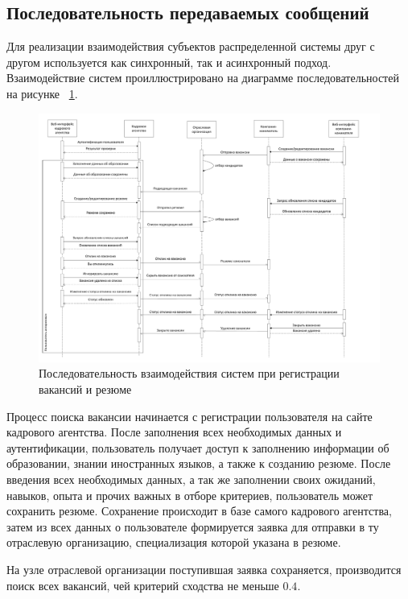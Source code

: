 \subsection{Последовательность передаваемых сообщений}
Для реализации взаимодействия субъектов распределенной системы друг с другом используется как синхронный, так и асинхронный подход. Взаимодействие систем проиллюстрировано на диаграмме последовательностей на рисунке ~\ref{fig:state-diag-hr}.

\begin{figure}[h!]
\centering
 \includegraphics[width=1.1\textwidth]{include/activity-diag2.pdf}
\caption{Последовательность взаимодействия систем при регистрации вакансий и резюме}
\label{fig:state-diag-hr}
\end{figure}

Процесс поиска вакансии начинается с регистрации пользователя на сайте кадрового агентства. После заполнения всех необходимых данных и аутентификации, пользователь получает доступ к заполнению информации об образовании, знании иностранных языков, а также к созданию резюме.
После введения всех необходимых данных, а так же заполнении своих ожиданий, навыков, опыта и прочих важных в отборе критериев, пользователь может сохранить резюме. 
Сохранение происходит в базе самого кадрового агентства, затем из всех данных о пользователе формируется заявка для отправки в ту отраслевую организацию, специализация которой указана в резюме. 

На узле отраслевой организации поступившая заявка сохраняется, производится поиск всех вакансий, чей критерий сходства не меньше $0.4$.

